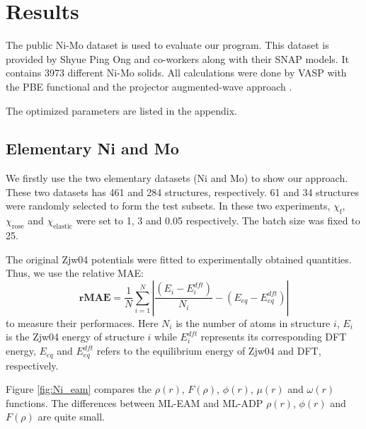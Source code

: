 \documentclass[final,3p,times]{elsarticle}
\begin{document}
% 
%
\section{Results}
\label{sec:results}

The public Ni-Mo dataset \cite{SNAP} is used to evaluate our program. This 
dataset is provided by Shyue Ping Ong and co-workers along with their SNAP 
models. It contains 3973 different Ni-Mo solids. All calculations were done by 
VASP \cite{VASP} with the PBE \cite{PBE} functional and the projector 
augmented-wave approach \cite{PAW}. 

The optimized parameters are listed in the appendix.

% 
%
\subsection{Elementary Ni and Mo}
\label{sec:elementary}

We firstly use the two elementary datasets (Ni and Mo) to show our approach. These 
two datasets has 461 and 284 structures, respectively. 61 and 34 structures were 
randomly selected to form the test subsets. In these two experiments, 
$\chi_{\mathrm{f}}$, $\chi_{\mathrm{rose}}$ and $\chi_{\mathrm{elastic}}$ were 
set to 1, 3 and 0.05 respectively. The batch size was fixed to 25.

The original Zjw04 potentials were fitted to experimentally obtained quantities.
Thus, we use the relative MAE:
\begin{equation}
\mathbf{rMAE} = \frac{1}{N}\sum_{i=1}^{N}{
    | \frac{(E_i - E_i^{dft})}{N_i} - (E_{eq} - E_{eq}^{dft}) |
}
\end{equation}
to measure their performaces. Here $N_i$ is the number of atoms in structure 
$i$, $E_i$ is the Zjw04 energy of structure $i$ while $E_i^{dft}$ represents its 
corresponding DFT energy, $E_{eq}$ and $E_{eq}^{dft}$ refers to the equilibrium 
energy of Zjw04 and DFT, respectively.

Figure \ref{fig:Ni_eam} compares the $\rho(r)$, $F(\rho)$, $\phi(r)$, 
$\mu(r)$ and $\omega(r)$ functions. The differences between ML-EAM and ML-ADP 
$\rho(r)$, $\phi(r)$ and $F(\rho)$ are quite small. 
\end{document}
